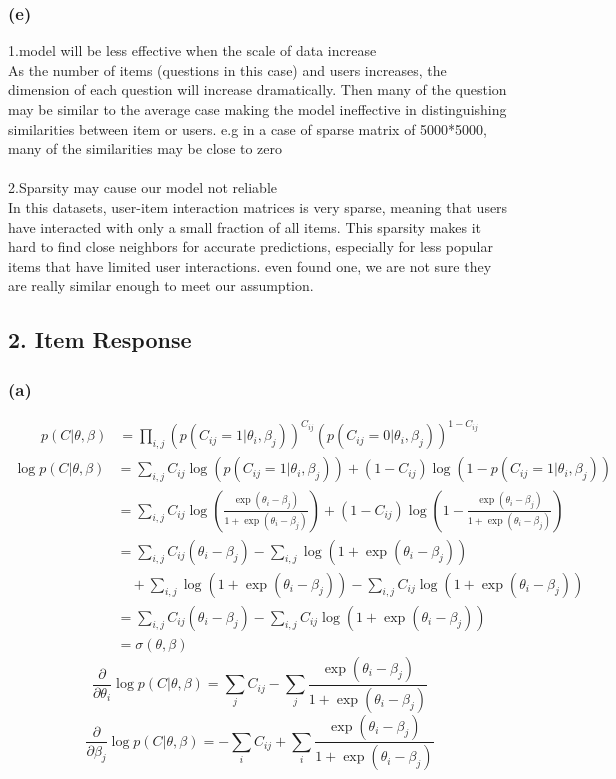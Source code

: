 \documentclass[12pt]{article}
\begin{document}
\subsubsection*{(e)}


1.model will be less effective when the scale of data increase\\
As the number of items (questions in this case) and users increases, the dimension of each question will increase dramatically. Then many of the question may be similar to the average case making the model ineffective in distinguishing similarities between item or users. e.g in a case of sparse matrix of 5000*5000, many of the similarities may be close to zero\\
\\
\noindent2.Sparsity may cause our model not reliable\\
In this datasets, user-item interaction matrices is very sparse, meaning that users have interacted with only a small fraction of all items. This sparsity makes it hard to find close neighbors for accurate predictions, especially for less popular items that have limited user interactions. even found one, we are not sure they are really similar enough to meet our assumption.
\newpage
\subsection*{2. Item Response}
\subsubsection*{(a)}
\begin{align*}
p(C|\theta,\beta) &= \prod_{i,j} \left( p(C_{ij}=1|\theta_i,\beta_j) \right)^{C_{ij}} \left(p(C_{ij}=0|\theta_i,\beta_j) \right)^{1 - C_{ij}}
\end{align*}
\begin{align*}
\log p(C|\theta,\beta) &= \sum_{i,j} C_{ij} \log \left( p(C_{ij}=1|\theta_i,\beta_j) \right) + (1 - C_{ij}) \log \left( 1 - p(C_{ij}=1|\theta_i,\beta_j) \right) \\
&= \sum_{i,j} C_{ij} \log \left( \frac{\exp(\theta_i - \beta_j)}{1 + \exp(\theta_i - \beta_j)} \right) + (1 - C_{ij}) \log \left( 1 - \frac{\exp(\theta_i - \beta_j)}{1 + \exp(\theta_i - \beta_j)} \right) \\
&= \sum_{i,j} C_{ij} (\theta_i - \beta_j) - \sum_{i,j} \log(1 + \exp(\theta_i - \beta_j)) \\
&\quad + \sum_{i,j} \log(1 + \exp(\theta_i - \beta_j)) - \sum_{i,j} C_{ij} \log(1 + \exp(\theta_i - \beta_j)) \\
&= \sum_{i,j} C_{ij} (\theta_i - \beta_j) - \sum_{i,j} C_{ij} \log(1 + \exp(\theta_i - \beta_j))\\
&=\sigma(\theta, \beta)
\end{align*}
$$\frac{\partial}{\partial \theta_i} \log p(C|\theta,\beta) = \sum_{j} C_{ij} - \sum_{j} \frac{\exp(\theta_i - \beta_j)}{1 + \exp(\theta_i - \beta_j)}$$
$$\frac{\partial}{\partial \beta_j} \log p(C|\theta,\beta) = - \sum_{i} C_{ij} + \sum_{i} \frac{\exp(\theta_i - \beta_j)}{1 + \exp(\theta_i - \beta_j)}
$$
\end{document}
